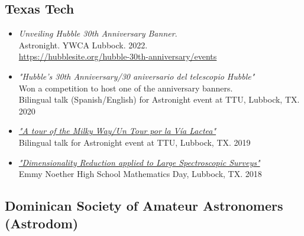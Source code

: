 \documentclass[letterpaper,10pt]{article}
\begin{document}
\subsection*{Texas Tech}

\begin{itemize}[label=$\blacktriangleright$]



	\item \textit{Unveiling Hubble 30th Anniversary Banner}. \\
Astronight. YWCA Lubbock. 2022. \\
\url{https://hubblesite.org/hubble-30th-anniversary/events}



	\item \textit{"Hubble's 30th Anniversary/30 aniversario del telescopio Hubble"} \\ Won a competition to host one of the anniversary banners. \\ Bilingual talk (Spanish/English) for Astronight event at TTU, Lubbock, TX. 2020
	



	\item \textit{\href{https://slides.com/mmarcano22/a-tour-of-the-milky-way-2\#/}{"A tour of the Milky Way/Un Tour por la V\'ia Lactea"}} \\ Bilingual talk for Astronight event at TTU, Lubbock, TX. 2019


	\item \textit{\href{http://manuelpm.me/PCASDSS/}{"Dimensionality Reduction applied to Large Spectroscopic Surveys"}} \\ Emmy Noether High School Mathematics Day, Lubbock, TX. 2018




\end{itemize}


\subsection*{Dominican Society of Amateur Astronomers (Astrodom)}
\end{document}
